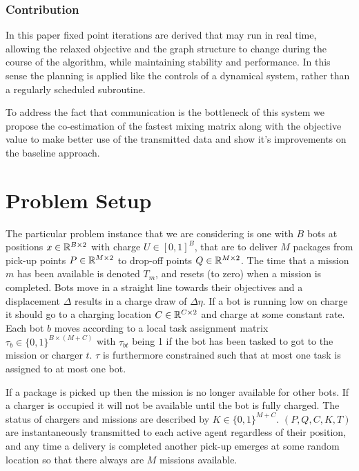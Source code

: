 \documentclass{article}
\newcommand{\sectiontype}{}
\begin{document}
\subsubsection*{Contribution}
In this paper fixed point iterations are derived that may run in real time, allowing the relaxed objective and the graph structure to change during the course of the algorithm, while maintaining stability and performance. In this sense the planning is applied like the controls of a dynamical system, rather than a regularly scheduled subroutine.

To address the fact that communication is the bottleneck of this system we propose the co-estimation of the fastest mixing matrix along with the objective value to make better use of the transmitted data and show it's improvements on the baseline approach.

\section*{Problem Setup}
\renewcommand{\sectiontype}{Problem Setup}
The particular problem instance that we are considering is one with $B$ bots at positions $x \in \mathbb{R}^{B\times2}$ with charge $U \in [0,1]^{B}$, that are to deliver $M$ packages from pick-up points $P \in \mathbb{R}^{M\times2}$ to drop-off points $Q \in \mathbb{R}^{M\times2}$. The time that a mission $m$ has been available is denoted $T_m$, and resets (to zero) when a mission is completed. Bots move in a straight line towards their objectives and a displacement $\Delta$ results in a charge draw of $\Delta \eta$. If a bot is running low on charge it should go to a charging location $C \in \mathbb{R}^{C\times2}$ and charge at some constant rate. Each bot $b$ moves according to a local task assignment matrix $\tau_b \in \{ 0, 1 \}^{B \times (M+C)}$ with $\tau_{bt}$ being 1 if the bot has been tasked to got to the mission or charger $t$. $\tau$ is furthermore constrained such that at most one task is assigned to at most one bot. 
\newline

 If a package is picked up then the mission is no longer available for other bots. If a charger is occupied it will not be available until the bot is fully charged. The status of chargers and missions are described by $K\in \{ 0, 1 \}^{M+C}$. $(P, Q, C, K, T)$ are instantaneously transmitted to each active agent regardless of their position, and any time a delivery is completed another pick-up emerges at some random location so that there always are $M$ missions available. \newline
\end{document}
